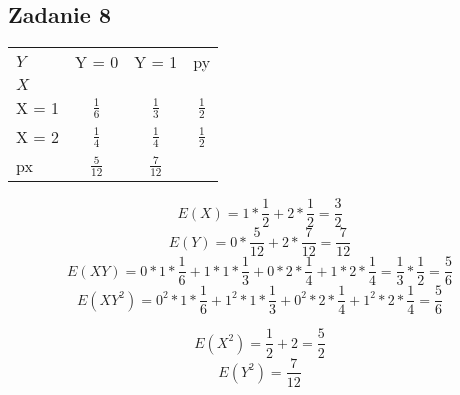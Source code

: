 \subsection{Zadanie 8}

\begin{center}
\begin{tabular}{ | l | c | c | c | }
\hline  
 \qquad  $Y$ & Y = 0 & Y = 1 & py \\
  $X$ &  &  &  \\
\hline  
 X = 1 & $\frac{1}{6}$ & $\frac{1}{3}$  & $\frac{1}{2}$ \\
\hline  
 X = 2 & $\frac{1}{4}$ & $\frac{1}{4}$ & $\frac{1}{2}$   \\
\hline  
px & $\frac{5}{12}$ & $\frac{7}{12}$  & \\
\hline  
\end{tabular}
\end{center}

$$ E(X) = 1 * \frac{1}{2} + 2 *  \frac{1}{2} = \frac{3}{2}$$
$$ E(Y) = 0 * \frac{5}{12} + 2 *  \frac{7}{12} = \frac{7}{12}$$
$$ E(XY) = 0 * 1 * \frac{1}{6} +  1 * 1 * \frac{1}{3} +  0 * 2 * \frac{1}{4} +  1 * 2 * \frac{1}{4} = \frac{1}{3}* \frac{1}{2} = \frac{5}{6}$$
$$ E(XY^2) = 0^2 * 1 * \frac{1}{6} +  1^2 * 1 * \frac{1}{3} +  0^2 * 2 * \frac{1}{4} +  1^2 * 2 * \frac{1}{4} = \frac{5}{6}$$


$$ E(X^2) = \frac{1}{2} + 2= \frac{5}{2}$$
$$ E(Y^2) = \frac{7}{12}$$
